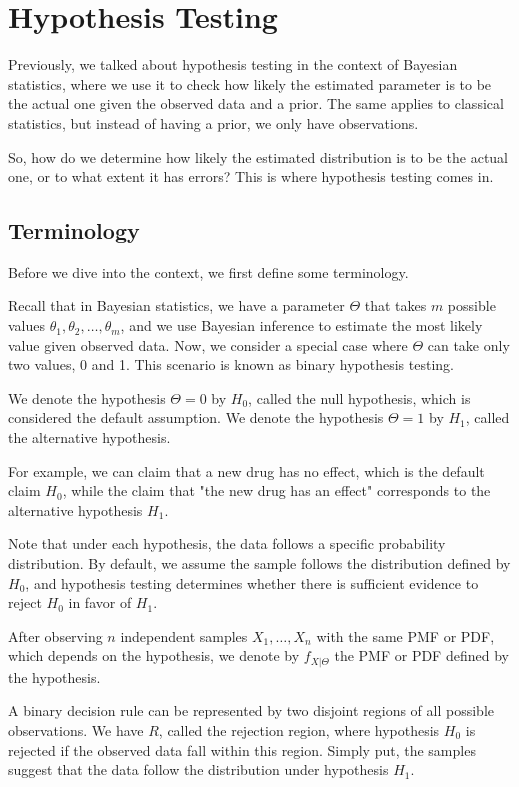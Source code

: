 \chapter{Hypothesis Testing}

Previously, we talked about hypothesis testing in the context of Bayesian statistics, where we use it to check how likely the estimated parameter is to be the actual one given the observed data and a prior. The same applies to classical statistics, but instead of having a prior, we only have observations.

So, how do we determine how likely the estimated distribution is to be the actual one, or to what extent it has errors? This is where hypothesis testing comes in.

\section{Terminology}
Before we dive into the context, we first define some terminology.

Recall that in Bayesian statistics, we have a parameter \(\Theta\) that takes \(m\) possible values \(\theta_1, \theta_2, \dots, \theta_m\), and we use Bayesian inference to estimate the most likely value given observed data. Now, we consider a special case where \(\Theta\) can take only two values, 0 and 1. This scenario is known as binary hypothesis testing.

We denote the hypothesis \(\Theta = 0\) by \(H_0\), called the null hypothesis, which is considered the default assumption. We denote the hypothesis \(\Theta = 1\) by \(H_1\), called the alternative hypothesis.  

For example, we can claim that a new drug has no effect, which is the default claim \(H_0\), while the claim that "the new drug has an effect" corresponds to the alternative hypothesis \(H_1\).

Note that under each hypothesis, the data follows a specific probability distribution. By default, we assume the sample follows the distribution defined by \(H_0\), and hypothesis testing determines whether there is sufficient evidence to reject \(H_0\) in favor of \(H_1\).

After observing \(n\) independent samples \(X_1, \dots, X_n\) with the same PMF or PDF, which depends on the hypothesis, we denote by \(f_{X \vert \Theta}\) the PMF or PDF defined by the hypothesis.

A binary decision rule can be represented by two disjoint regions of all possible observations. We have \(R\), called the rejection region, where hypothesis \(H_0\) is rejected if the observed data fall within this region. Simply put, the samples suggest that the data follow the distribution under hypothesis \(H_1\).  

